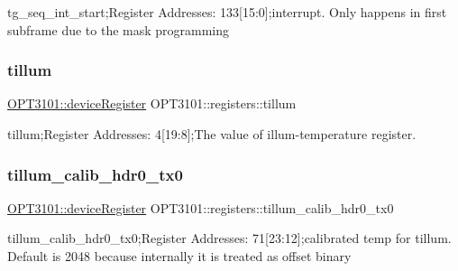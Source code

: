 tg\+\_\+seq\+\_\+int\+\_\+start;Register Addresses\+: 133\mbox{[}15\+:0\mbox{]};interrupt. Only happens in first subframe due to the mask programming 

\mbox{\label{class_o_p_t3101_1_1registers_a8a097a41ecdf2b98226c4a3a92121c12}} 
\subsubsection{\texorpdfstring{tillum}{tillum}}
{\footnotesize\ttfamily \mbox{\hyperlink{class_o_p_t3101_1_1device_register}{O\+P\+T3101\+::device\+Register}} O\+P\+T3101\+::registers\+::tillum}



tillum;Register Addresses\+: 4\mbox{[}19\+:8\mbox{]};The value of illum-\/temperature register. 

\mbox{\label{class_o_p_t3101_1_1registers_ab99a33d2813594b5b1351e92ea43df6a}} 
\subsubsection{\texorpdfstring{tillum\+\_\+calib\+\_\+hdr0\+\_\+tx0}{tillum\_calib\_hdr0\_tx0}}
{\footnotesize\ttfamily \mbox{\hyperlink{class_o_p_t3101_1_1device_register}{O\+P\+T3101\+::device\+Register}} O\+P\+T3101\+::registers\+::tillum\+\_\+calib\+\_\+hdr0\+\_\+tx0}



tillum\+\_\+calib\+\_\+hdr0\+\_\+tx0;Register Addresses\+: 71\mbox{[}23\+:12\mbox{]};calibrated temp for tillum. Default is 2048 because internally it is treated as offset binary 

\mbox{\label{class_o_p_t3101_1_1registers_aaa41e9820a7a006305ef538a8e3ac657}} 
